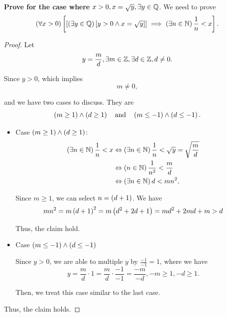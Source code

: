 \textbf{Prove for the case where $x > 0, x = \sqrt{y}, \exists y \in \mathbb{Q}$}. 
We need to prove 
\begin{equation*}
    \left(\forall x > 0\right)\left[\left[\left(\exists y \in \mathbb{Q}\right)\left[y > 0 \wedge x = \sqrt{y}\right]\right] \implies \left(\exists n \in \mathbb{N} \right) \frac{1}{n} < x\right].
\end{equation*}
\begin{proof}
    Let 
    \begin{equation*}
        y = \frac{m }{d}, \exists m \in \mathbb{Z}, \exists d \in \mathbb{Z}, d \neq 0. 
    \end{equation*}

    Since $y > 0$, which implies 
    \begin{equation*}
        m \neq 0, 
    \end{equation*}

    and we have two cases to discuss. They are 
    \begin{equation*}
        \left(m \geq 1\right)\wedge\left(d \geq 1\right) \quad \text{and} \quad \left(m \leq -1\right)\wedge\left(d \leq -1\right). 
    \end{equation*}

    \begin{itemize}
        \item Case $\left(m \geq 1\right)\wedge\left(d \geq 1\right)$: 
        \begin{align*}
            \left(\exists n \in \mathbb{N}\right)\frac{1}{n} < x &\Leftrightarrow \left(\exists n \in \mathbb{N}\right)\frac{1}{n} < \sqrt{y} = \sqrt{\frac{m }{d}} \\
            &\Leftrightarrow \left(n \in \mathbb{N} \right) \frac{1}{n^2} < \frac{m }{d} \\
            &\Leftrightarrow \left(\exists n \in \mathbb{N} \right) d < mn^2,  
        \end{align*}

        Since $m \geq 1$, we can select $n = \left(d + 1\right)$. We have 
        \begin{equation*}
            mn^2 = m\left(d + 1\right)^2 = m\left(d^2 + 2d + 1\right) = md^2 + 2md + m > d
        \end{equation*}

        Thus, the claim hold. 
        \item Case $\left(m \leq -1\right)\wedge \left(d \leq -1\right)$
        
        Since $y > 0$, we are able to multiple $y$ by $\frac{-1}{-1} = 1$, where we have 
        \begin{equation*}
            y = \frac{m }{d} \cdot 1 = \frac{m }{d} \cdot \frac{-1}{-1} = \frac{-m }{-d}, -m \geq 1, -d \geq 1. 
        \end{equation*}

        Then, we treat this case similar to the last case. 
    \end{itemize}

    Thus, the claim holds. 
\end{proof}

